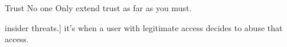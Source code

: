 Trust No one 
Only extend trust as far as you must.

insider threats.]
  it's when a user with legitimate access decides to abuse that access. 